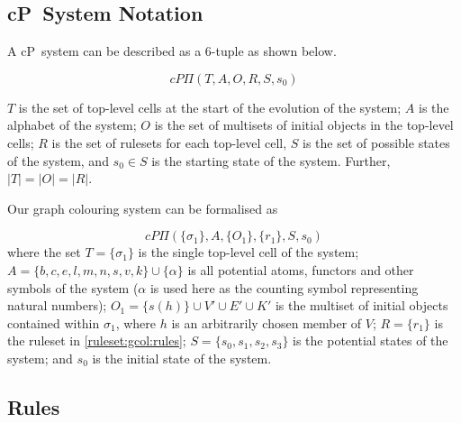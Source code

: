 \subsection{\label{sec:gcol:notation}cP~System Notation}
A cP~system can be described as a 6-tuple as shown below.

\[
cP\Pi(T, A, O, R, S, s_0)
\]

\(T\) is the set of top-level cells at the start of the evolution of the system; \(A\) is the alphabet of the system; \(O\) is the set of multisets of initial objects in the top-level cells; \(R\) is the set of rulesets for each top-level cell, \(S\) is the set of possible states of the system, and \(s_0 \in S\) is the starting state of the system. Further, \(|T| = |O| = |R|\).

Our graph colouring system can be formalised as

\[
cP\Pi(\{\sigma_1\}, A, \{O_1\}, \{r_1\}, S, s_0)
\] where the set \(T = \{\sigma_1\}\) is the single top-level cell of the system; \(A = \{b, c, e,\allowbreak l,\allowbreak m,\allowbreak n, s, v, k\} \allowbreak \cup \{\alpha\}\) is all potential atoms, functors and other symbols of the system (\(\alpha\) is used here as the counting symbol representing natural numbers); \(O_1 = \{s(h)\} \cup V' \allowbreak \cup E' \allowbreak \cup K'\) is the multiset of initial objects contained within \(\sigma_1\), where \(h\) is an arbitrarily chosen member of \(V\); \(R = \{r_1\}\) is the ruleset in \autoref{ruleset:gcol:rules}; \(S = \{s_0, s_1, s_2, s_3\}\) is the potential states of the system; and \(s_0\) is the initial state of the system.



\subsection{\label{sec:gcol:rules}Rules}

